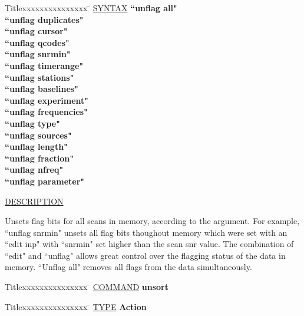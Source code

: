 \begin{tabbing}
Titlexxxxxxxxxxxxxxx \= \kill
\underline{SYNTAX} \> {\bf 		``unflag all"} \\
\> {\bf 		``unflag duplicates"} \\
\> {\bf 		``unflag cursor"} \\
\> {\bf 		``unflag qcodes"} \\
\> {\bf 		``unflag snrmin"} \\
\> {\bf 		``unflag timerange"} \\
\> {\bf 		``unflag stations"} \\
\> {\bf 		``unflag baselines"} \\
\> {\bf 		``unflag experiment"} \\
\> {\bf 		``unflag frequencies"} \\
\> {\bf 		``unflag type"} \\
\> {\bf 		``unflag sources"} \\
\> {\bf 		``unflag length"} \\
\> {\bf 		``unflag fraction"} \\
\> {\bf 		``unflag nfreq"} \\
\> {\bf 		``unflag parameter"} \\
\end{tabbing}

\underline{DESCRIPTION}
\begin{list}{}{\setlength{\leftmargin}{0.5in}
     \setlength{\rightmargin}{0in}}
\item
Unsets flag bits for all scans in memory, according to the
argument.  For example, ``unflag snrmin" unsets all flag bits
thoughout memory which were set with an ``edit inp" with
``snrmin" set higher than the scan snr value.  The combination
of ``edit" and ``unflag" allows great control over the flagging
status of the data in memory.  ``Unflag all" removes all flags
from the data simultaneously.
\end{list}
\vspace{.2in}

\begin{tabbing}
Titlexxxxxxxxxxxxxxx \= \kill
\underline{COMMAND} \> {\bf 	unsort} \\
\end{tabbing}

\begin{tabbing}
Titlexxxxxxxxxxxxxxx \= \kill
\underline{TYPE} \> {\bf 		Action} \\
\end{tabbing}

